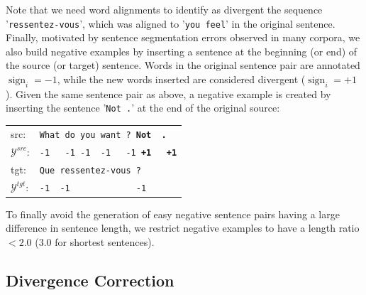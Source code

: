 \documentclass[11pt,a4paper]{article}
\begin{document}
Note that we need word alignments to identify as divergent the sequence '\texttt{ressentez-vous}', which was aligned to '\texttt{you feel}' in the original sentence.
Finally, motivated by sentence segmentation errors observed in many corpora, we also build negative examples by inserting a sentence at the beginning (or end) of the source (or target) sentence. 
Words in the original sentence pair are annotated $\operatorname{sign}_i=-1$, while the new words inserted are considered divergent ($\operatorname{sign}_i=+1$).
Given the same sentence pair as above, a negative example is created by inserting the sentence '\texttt{Not .}' at the end of the original source:

\begin{table}[h]
\center
\begin{tabular}{ll}
src: & { \small \texttt{What do you want ? {\bf Not \ .}}} \\
$\mathcal{Y}^{src}$: & { \small \texttt{-1 \ \  -1 -1 \ -1  \ \ -1 {\bf +1\ \ \  +1}}} \\
tgt: & { \small \texttt{Que ressentez-vous ?}} \\
$\mathcal{Y}^{tgt}$: & { \small \texttt{-1\ \ -1\ \ \ \ \ \ \ \ \ \ \ \ \ -1}} \\
\end{tabular}
\end{table}

To finally avoid the generation of easy negative sentence pairs having a large difference in sentence length, we restrict negative examples to have a length ratio $< 2.0$ ($3.0$ for shortest sentences).

\subsection{Divergence Correction}
\label{correction}
\end{document}
